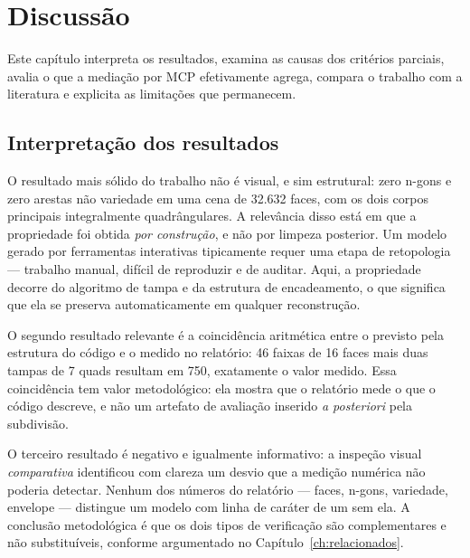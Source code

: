 \chapter{Discuss\~ao}\label{ch:discussao}

Este cap\'itulo interpreta os resultados, examina as causas dos crit\'erios parciais,
avalia o que a media{\c{c}}\~ao por MCP efetivamente agrega, compara o trabalho com a
literatura e explicita as limita{\c{c}}\~oes que permanecem.

\section{Interpreta{\c{c}}\~ao dos resultados}

O resultado mais s\'olido do trabalho n\~ao \'e visual, e sim estrutural: zero n-gons e zero
arestas n\~ao variedade em uma cena de 32.632 faces, com os dois corpos principais
integralmente quadr\^angulares. A relev\^ancia disso est\'a em que a propriedade foi obtida
\emph{por constru{\c{c}}\~ao}, e n\~ao por limpeza posterior. Um modelo gerado por
ferramentas interativas tipicamente requer uma etapa de retopologia --- trabalho manual,
dif\'icil de reproduzir e de auditar. Aqui, a propriedade decorre do algoritmo de tampa e da
estrutura de encadeamento, o que significa que ela se preserva automaticamente em qualquer
reconstru{\c{c}}\~ao.

O segundo resultado relevante \'e a coincid\^encia aritm\'etica entre o previsto pela
estrutura do c\'odigo e o medido no relat\'orio: 46 faixas de 16 faces mais duas tampas de 7
quads resultam em 750, exatamente o valor medido. Essa coincid\^encia tem valor
metodol\'ogico: ela mostra que o relat\'orio mede o que o c\'odigo descreve, e n\~ao
um artefato de avalia{\c{c}}\~ao inserido \emph{a posteriori} pela subdivis\~ao.

O terceiro resultado \'e negativo e igualmente informativo: a inspe{\c{c}}\~ao visual
\emph{comparativa} identificou com clareza um desvio que a medi{\c{c}}\~ao num\'erica
n\~ao poderia detectar. Nenhum dos n\'umeros do relat\'orio --- faces, n-gons, variedade,
envelope --- distingue um modelo com linha de car\'ater de um sem ela. A conclus\~ao
metodol\'ogica \'e que os dois tipos de verifica{\c{c}}\~ao s\~ao complementares e
n\~ao substitu\'iveis, conforme argumentado no Cap\'itulo~\ref{ch:relacionados}.


